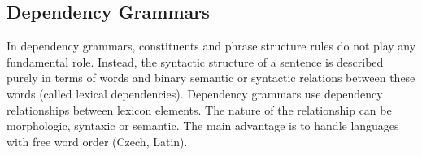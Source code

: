 \subsection{Dependency Grammars}

In dependency grammars, constituents and phrase structure rules do not play any fundamental role. Instead, the syntactic structure of a sentence is described purely in terms of words and binary semantic or syntactic relations between these words (called lexical dependencies). Dependency grammars use dependency relationships between lexicon elements. The nature of the relationship can be morphologic, syntaxic or semantic. The main advantage is to handle languages with free word order (Czech, Latin).